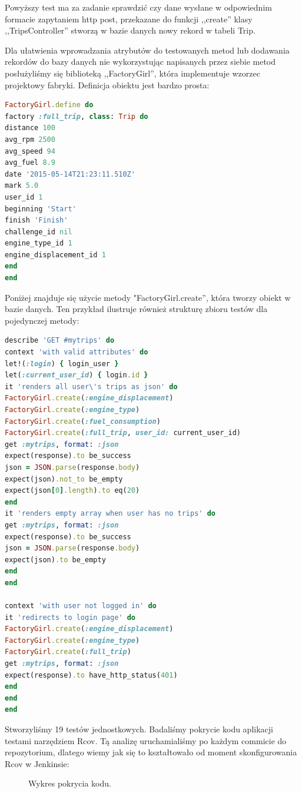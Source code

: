 \documentclass[eng,oneside]{mgr}
\begin{document}
Powyższy test ma za zadanie sprawdzić czy dane wysłane w odpowiednim formacie zapytaniem http post, przekazane do funkcji ,,create'' klasy ,,TripsController'' stworzą w bazie danych nowy rekord w tabeli Trip. 

Dla ułatwienia wprowadzania atrybutów do testowanych metod lub dodawania rekordów do bazy danych nie wykorzystując napisanych przez siebie metod posłużyliśmy się biblioteką ,,FactoryGirl'', która implementuje wzorzec projektowy fabryki. Definicja obiektu jest bardzo prosta:

\begin{lstlisting}[language=Ruby, caption={Definicja FactoryGirl.}]
FactoryGirl.define do 
factory :full_trip, class: Trip do
distance 100
avg_rpm 2500
avg_speed 94
avg_fuel 8.9
date '2015-05-14T21:23:11.510Z'
mark 5.0
user_id 1
beginning 'Start'
finish 'Finish'
challenge_id nil
engine_type_id 1
engine_displacement_id 1
end
end
\end{lstlisting}

Poniżej znajduje się użycie metody "FactoryGirl.create'', która tworzy obiekt w bazie danych. Ten przykład ilustruje również strukturę zbioru testów dla pojedynczej metody:

\begin{lstlisting}[language=Ruby, caption={Użycie FactoryGirl.}]
describe 'GET #mytrips' do
context 'with valid attributes' do
let!(:login) { login_user }
let(:current_user_id) { login.id }
it 'renders all user\'s trips as json' do
FactoryGirl.create(:engine_displacement)
FactoryGirl.create(:engine_type)
FactoryGirl.create(:fuel_consumption)
FactoryGirl.create(:full_trip, user_id: current_user_id)
get :mytrips, format: :json
expect(response).to be_success
json = JSON.parse(response.body)
expect(json).not_to be_empty
expect(json[0].length).to eq(20)
end
it 'renders empty array when user has no trips' do
get :mytrips, format: :json
expect(response).to be_success
json = JSON.parse(response.body)
expect(json).to be_empty
end
end

context 'with user not logged in' do
it 'redirects to login page' do
FactoryGirl.create(:engine_displacement)
FactoryGirl.create(:engine_type)
FactoryGirl.create(:full_trip)
get :mytrips, format: :json
expect(response).to have_http_status(401)
end
end
end
\end{lstlisting}

Stworzyliśmy 19 testów jednostkowych. Badaliśmy pokrycie kodu aplikacji testami narzędziem Rcov. Tą analizę uruchamialiśmy po każdym commicie do repozytorium, dlatego wiemy jak się to kształtowało od moment skonfigurowania Rcov w Jenkinsie:
\begin{figure}[h]
	\centering
	\caption{Wykres pokrycia kodu.}
	\label{fig:testy}
\end{figure}
\end{document}
